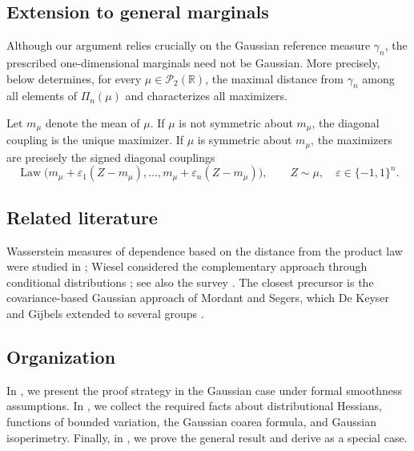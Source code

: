 \documentclass[11pt]{amsart}
\theoremstyle{definition}
\newcommand{\R}{\mathbb{R}}
\newcommand{\Pcal}{\mathcal{P}}
\newcommand{\Law}{\operatorname{Law}}
\begin{document}
\subsection{Extension to general marginals}

Although our argument relies crucially on the Gaussian reference
measure $\gamma_n$, the prescribed one-dimensional marginals need not
be Gaussian. More precisely,  below determines, for every
$\mu\in\Pcal_2(\R)$, the maximal distance from $\gamma_n$ among all
elements of $\Pi_n(\mu)$ and characterizes all maximizers.

Let $m_\mu$ denote the mean of $\mu$. If $\mu$ is not symmetric about
$m_\mu$, the diagonal coupling is the unique maximizer. If $\mu$ is
symmetric about $m_\mu$, the maximizers are precisely the signed
diagonal couplings
\[
  \Law\bigl(
    m_\mu+\varepsilon_1(Z-m_\mu),\ldots,
    m_\mu+\varepsilon_n(Z-m_\mu)
  \bigr),
  \qquad
  Z\sim\mu,\quad
  \varepsilon\in\{-1,1\}^n.
\]

\subsection{Related literature}
Wasserstein measures of dependence based on the distance from the
product law were studied in
\cite{MoSz20,NiStMu25,OzLyBeVaLeSe19}; Wiesel considered the
complementary approach through conditional distributions
\cite{Wi22}; see also the survey \cite{CaLa25}. The closest precursor
is the covariance-based Gaussian approach of Mordant and Segers, which
De Keyser and Gijbels extended to several groups
\cite{DeKeGi25,MoSe22}.


\subsection{Organization}
In , we present the proof strategy in the Gaussian
case under formal smoothness assumptions. In , we collect
the required facts about distributional Hessians, functions of bounded
variation, the Gaussian coarea formula, and Gaussian isoperimetry.
Finally, in , we prove the general result and derive
 as a special case.
\end{document}

